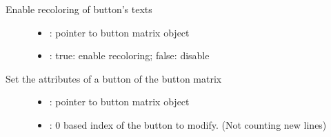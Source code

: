 \documentclass[letterpaper,10pt,english]{sphinxmanual}
\begin{document}

\begin{fulllineitems}
\label{\detokenize{object-types/btnm:_CPPv419lv_btnm_set_recolorPK8lv_obj_tb}}%
\pysigstartmultiline
{}\label{\detokenize{object-types/btnm:lv__btnm_8h_1abd93534e13a034300d265d338a797dab}}%
\pysigstopmultiline
Enable recoloring of button’s texts \begin{description}
\item[{}] \leavevmode\begin{itemize}
\item {} 
: pointer to button matrix object 

\item {} 
: true: enable recoloring; false: disable 

\end{itemize}

\end{description}


\end{fulllineitems}


\begin{fulllineitems}
\label{\detokenize{object-types/btnm:_CPPv420lv_btnm_set_btn_ctrlPK8lv_obj_t8uint16_t14lv_btnm_ctrl_t}}%
\pysigstartmultiline
{}\label{\detokenize{object-types/btnm:lv__btnm_8h_1ae21cc7a66d0ffd2b3ee4936e3549c7ab}}%
\pysigstopmultiline
Set the attributes of a button of the button matrix \begin{description}
\item[{}] \leavevmode\begin{itemize}
\item {} 
: pointer to button matrix object 

\item {} 
: 0 based index of the button to modify. (Not counting new lines) 

\end{itemize}

\end{description}


\end{fulllineitems}
\end{document}
